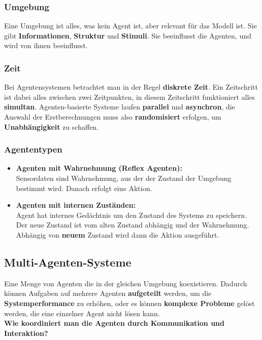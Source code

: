 \documentclass[a4paper]{article}
\begin{document}
\subsubsection{Umgebung}
Eine Umgebung ist alles, was kein Agent ist, aber relevant für das Modell ist. Sie gibt \textbf{Informationen}, \textbf{Struktur} und \textbf{Stimuli}. Sie beeinflusst die Agenten, und wird von ihnen beeinflusst.
\subsubsection{Zeit}
Bei Agentensystemen betrachtet man in der Regel \textbf{diskrete Zeit}. Ein Zeitschritt ist dabei alles zwischen zwei Zeitpunkten, in diesem Zeitschritt funktioniert alles \textbf{simultan}. Agenten-basierte Systeme laufen \textbf{parallel} und \textbf{asynchron}, die Auswahl der Erstberechnungen muss also \textbf{randomisiert} erfolgen, um \textbf{Unabhängigkeit} zu schaffen.
\subsubsection{Agententypen}
\begin{itemize}
	\item \textbf{Agenten mit Wahrnehmung (Reflex Agenten):}\\
	Sensordaten sind Wahrnehmung, aus der der Zustand der Umgebung bestimmt wird. Danach erfolgt eine Aktion.
	\item \textbf{Agenten mit internen Zuständen:}\\
	Agent hat internes Gedächtnis um den Zustand des Systems zu speichern. Der neue Zustand ist vom alten Zustand abhängig und der Wahrnehmung. Abhängig von \textbf{neuem} Zustand wird dann die Aktion ausgeführt.
\end{itemize}

\subsection{Multi-Agenten-Systeme}
Eine Menge von Agenten die in der gleichen Umgebung koexistieren. Dadurch können Aufgaben auf mehrere Agenten \textbf{aufgeteilt} werden, um die \textbf{Systemperformance} zu erhöhen, oder es können \textbf{komplexe Probleme} gelöst werden, die eine einzelner Agent nicht lösen kann.\\

\textbf{Wie koordiniert man die Agenten durch Kommunikation und Interaktion?}\\
\end{document}
